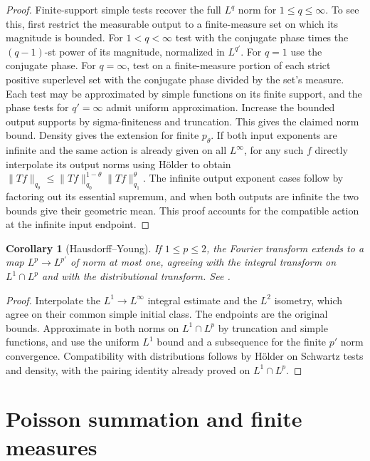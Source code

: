 \documentclass[11pt,oneside,openany]{book}
\newtheorem{corollary}[theorem]{Corollary}
\theoremstyle{definition}
\theoremstyle{remark}
\begin{document}
\begin{proof}
Finite-support simple tests recover the full \(L^q\) norm for \(1\le q\le\infty\). To see this, first restrict the measurable output to a finite-measure set on which its magnitude is bounded. For \(1<q<\infty\) test with the conjugate phase times the \((q-1)\)-st power of its magnitude, normalized in \(L^{q'}\). For \(q=1\) use the conjugate phase. For \(q=\infty\), test on a finite-measure portion of each strict positive superlevel set with the conjugate phase divided by the set's measure. Each test may be approximated by simple functions on its finite support, and the phase tests for \(q'= \infty\) admit uniform approximation. Increase the bounded output supports by sigma-finiteness and truncation. This gives the claimed norm bound. Density gives the extension for finite \(p_\theta\). If both input exponents are infinite and the same action is already given on all \(L^\infty\), for any such \(f\) directly interpolate its output norms using Hölder to obtain \(\|Tf\|_{q_\theta}\le\|Tf\|_{q_0}^{1-\theta}\|Tf\|_{q_1}^\theta\). The infinite output exponent cases follow by factoring out its essential supremum, and when both outputs are infinite the two bounds give their geometric mean. This proof accounts for the compatible action at the infinite input endpoint.
\end{proof}

\begin{corollary}[Hausdorff--Young]
\label{p102:AN-06-C04-S01}
If \(1\le p\le2\), the Fourier transform extends to a map \(L^p\to L^{p'}\) of norm at most one, agreeing with the integral transform on \(L^1\cap L^p\) and with the distributional transform. See \cite[\S2.2.4]{grafakos}.
\end{corollary}
\begin{proof}
Interpolate the \(L^1\to L^\infty\) integral estimate and the \(L^2\) isometry, which agree on their common simple initial class. The endpoints are the original bounds. Approximate in both norms on \(L^1\cap L^p\) by truncation and simple functions, and use the uniform \(L^1\) bound and a subsequence for the finite \(p'\) norm convergence. Compatibility with distributions follows by Hölder on Schwartz tests and density, with the pairing identity already proved on \(L^1\cap L^p\).
\end{proof}

\section{Poisson summation and finite measures}
\end{document}
